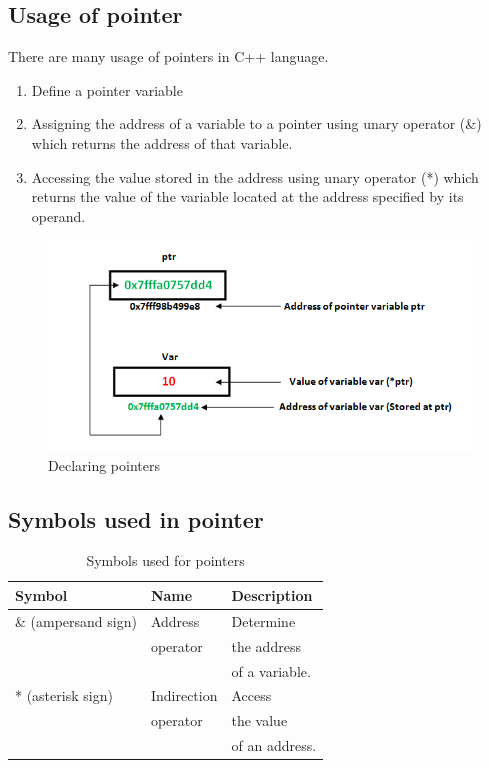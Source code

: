 \documentclass{book}
\begin{document}
\subsection{Usage of pointer}

There are many usage of pointers in C++ language.

\begin{enumerate}
\item Define a pointer variable
\item Assigning the address of a variable to a pointer using unary operator (&) which returns the address of that variable.
\item Accessing the value stored in the address using unary operator (*) which returns the value of the variable located at the address specified by its operand.
		
\end{enumerate}

\begin{figure}[h]
\includegraphics[width=\columnwidth]{pointers-in-c}
\caption{Declaring pointers}%
\label{}%
\end{figure}


\subsection{Symbols used in pointer}

\begin{table}[h]
\centering 
\begin{tabular}{lll} \hline 
Symbol	& Name	& Description \\ \hline 
\& (ampersand sign)	& Address & Determine \\ 
& operator	& the address \\
& &  of a variable. \\
* (asterisk sign)	& Indirection & Access \\ 
& operator	& the value \\
& & of an address. \\ \hline 
\end{tabular}
\caption{Symbols used for pointers}
\label{}
\end{table}
\end{document}
